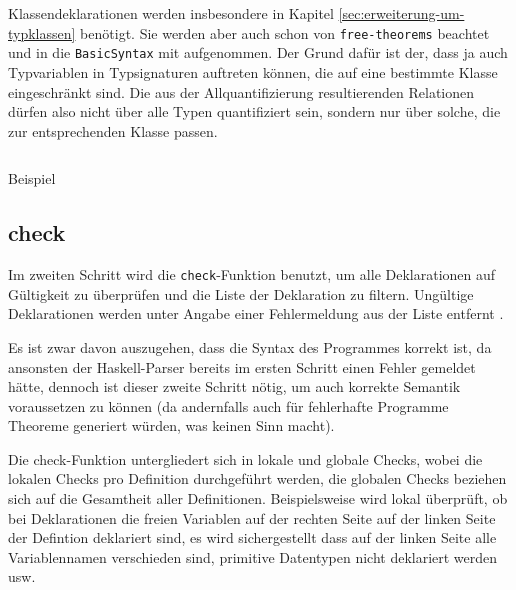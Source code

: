 Klassendeklarationen werden insbesondere in Kapitel \ref{sec:erweiterung-um-typklassen} benötigt. Sie werden aber auch schon
von \texttt{free-theorems} beachtet und in die \texttt{BasicSyntax} mit aufgenommen. Der Grund dafür ist der, dass ja auch
Typvariablen in Typsignaturen auftreten können, die auf eine bestimmte Klasse eingeschränkt sind. Die aus der Allquantifizierung
resultierenden Relationen dürfen also nicht über alle Typen quantifiziert sein, sondern nur über solche, die zur entsprechenden
Klasse passen.


\begin{listing}[ht]
\inputminted[tabsize=2]{haskell}{ast2.hs}
\caption{Beispiel}
\label{lst:ast-data}
\end{listing}


\subsection{check}

\label{sec:check}

Im zweiten Schritt wird die \texttt{check}-Funktion benutzt, um alle Deklarationen auf Gültigkeit zu überprüfen und die Liste der Deklaration zu filtern. Ungültige Deklarationen
werden unter Angabe einer Fehlermeldung aus der Liste entfernt \cite{freetheorems}.

Es ist zwar davon auszugehen, dass die Syntax des Programmes korrekt ist, da ansonsten der Haskell-Parser bereits im ersten Schritt einen Fehler gemeldet hätte, dennoch ist
dieser zweite Schritt nötig, um auch korrekte Semantik voraussetzen zu können  (da andernfalls auch für fehlerhafte Programme Theoreme generiert würden, was keinen Sinn macht).

Die check-Funktion untergliedert sich in lokale und globale Checks, wobei die lokalen Checks pro Definition durchgeführt werden, die globalen Checks beziehen sich auf die Gesamtheit aller Definitionen. Beispielsweise wird lokal überprüft, ob bei Deklarationen die freien Variablen auf der rechten Seite auf der linken Seite der Defintion deklariert sind, es wird sichergestellt
dass auf der linken Seite alle Variablennamen verschieden sind, primitive Datentypen nicht deklariert werden usw.

